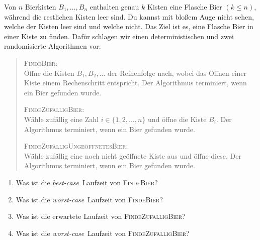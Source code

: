 \documentclass{uebung_cs}
\begin{document}
\begin{aufgabe}[Bierkisten]
	Von $n$ Bierkisten $B_1,\dots,B_n$ enthalten genau $k$ Kisten eine Flasche Bier $(k \leq n)$, während die restlichen Kisten leer sind. Du kannst mit bloßem Auge nicht sehen, welche der Kisten leer sind und welche nicht. Das Ziel ist es, eine Flasche Bier in einer Kiste zu finden. Dafür schlagen wir einen deterministischen und zwei randomisierte Algorithmen vor:
	\begin{quote}
		\textsc{FindeBier}:\\
		Öffne die Kisten $B_1,B_2,\dots$ der Reihenfolge nach, wobei das Öffnen einer Kiste einem Rechenschritt entspricht.
		Der Algorithmus terminiert, wenn ein Bier gefunden wurde. 

		\textsc{FindeZufälligBier}:\\
		Wähle zufällig eine Zahl $i \in \{1,2,\dots,n\}$ und öffne die Kiste $B_i$.
		Der Algorithmus terminiert, wenn ein Bier gefunden wurde. 

		\textsc{FindeZufälligUngeöffnetesBier}:\\
		Wähle zufällig eine noch nicht geöffnete Kiste aus und öffne diese.	
		Der Algorithmus terminiert, wenn ein Bier gefunden wurde. 
	\end{quote}
	
	\begin{enumerate}
		\item Was ist die \textit{best-case}~Laufzeit von \textsc{FindeBier}?
		\item Was ist die \textit{worst-case}~Laufzeit von \textsc{FindeBier}?
	\end{enumerate}
		
	\begin{enumerate}
		\setcounter{enumi}{2}
		\item Was ist die erwartete Laufzeit von \textsc{FindeZufälligBier}?
		\item Was ist die \textit{worst-case}~Laufzeit von \textsc{FindeZufälligBier}?
	\end{enumerate}	
	

\end{aufgabe}
\end{document}
